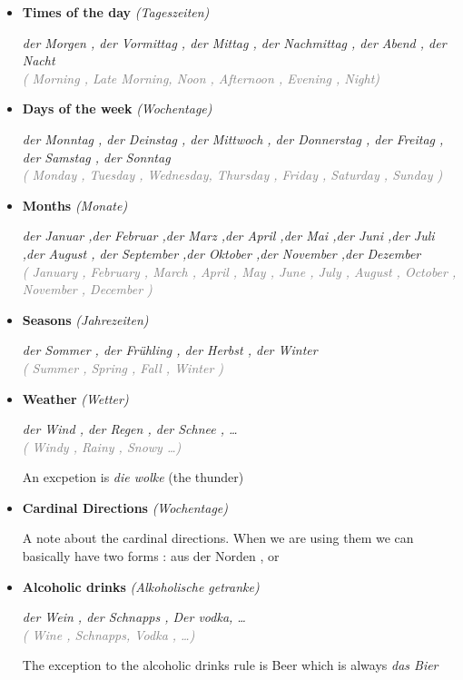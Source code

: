 \documentclass[a4paper,twocolumn,10pt]{article}
\newcommand{\newpar}
{\par \vspace{0.3cm}}
\begin{document}
\begin{itemize}[noitemsep]
	\item \textbf{Times of the day} \textit{ (Tageszeiten) }

\noindent
\textit{der Morgen , der Vormittag , der Mittag , der Nachmittag ,
	der Abend , der Nacht}\\
\textcolor{gray} { \textit{( Morning , Late Morning, Noon , Afternoon , Evening
		, Night)} } \newpar

	\item \textbf{Days of the week} \textit{ (Wochentage) }

\noindent
\textit{der Monntag , der Deinstag , der Mittwoch , der Donnerstag , der Freitag
, der Samstag , der Sonntag}\\
\textcolor{gray} { \textit{( Monday , Tuesday , Wednesday, Thursday , Friday ,
		Saturday , Sunday )} } \newpar

	\item \textbf{Months} \textit{ (Monate) }

\noindent \textit{der Januar ,der Februar ,der Marz ,der April ,der Mai ,der
	Juni ,der Juli ,der August , der September ,der Oktober ,der November ,der
	Dezember }\\
\textcolor{gray} { \textit{( January , February , March , April , May , June ,
		July , August , October , November , December  )} } \newpar

	\item \textbf{Seasons} \textit{ (Jahrezeiten) }
		
		\noindent
		\textit{der Sommer , der Frühling , der Herbst , der Winter }\\
		\textcolor{gray} { \textit{( Summer , Spring  , Fall , Winter  )} } \newpar
		
	\item \textbf{Weather} \textit{ (Wetter) }

		
		\noindent
		\textit{der Wind , der Regen , der Schnee , \ldots}\\
		\textcolor{gray} { \textit{( Windy , Rainy , Snowy \ldots )} } \newpar
		
		An excpetion is \textit{die wolke} (the thunder)\\

	\item \textbf{Cardinal Directions} \textit{ (Wochentage) }

A note about the cardinal directions. When we are using them we can basically
have two forms : aus der Norden , or \\



	\item \textbf{Alcoholic drinks} \textit{ (Alkoholische getranke) }

		
		\noindent
		\textit{der Wein , der Schnapps , Der vodka, \ldots}\\
		\textcolor{gray} { \textit{( Wine , Schnapps, Vodka , \ldots )} } \newpar 
		The exception to the alcoholic drinks rule is Beer which is always
		\textit{das Bier}\\


\end{itemize}
\end{document}
